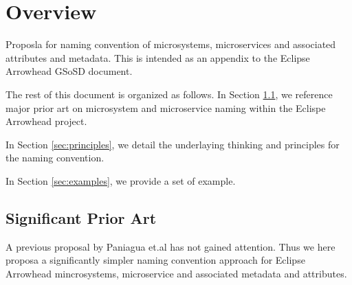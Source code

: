 \documentclass[a4paper]{arrowhead}
\begin{document}
\tableofcontents
\newpage

\section{Overview}
\label{sec:overview}
  Proposla for naming convention of microsystems, microservices and
    associated attributes and metadata. This is intended as an
    appendix to the Eclipse Arrowhead GSoSD document.
    
The rest of this document is organized as follows.
In Section \ref{sec:prior_art}, we reference major prior art on
microsystem and microservice naming within the Eclispe Arrowhead project. 

In Section \ref{sec:principles}, we detail the underlaying thinking
and principles for the
naming convention.

In Section \ref{sec:examples}, we provide a set of example.


\newpage

\subsection{Significant Prior Art}
\label{sec:prior_art}

A previous proposal by Paniagua et.al \cite{Paniagua_2019} has not
  gained attention. Thus we here proposa a significantly simpler
  naming convention approach for Eclipse Arrowhead mincrosystems,
  microservice and associated metadata and attributes.
\end{document}
